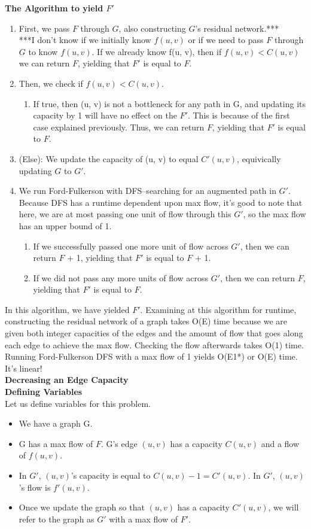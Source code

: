 \documentclass[11pt, solution, letterpaper]{format}
\begin{document}
\textbf{The Algorithm to yield $F'$}
\begin{enumerate}
\item First, we pass $F$ through $G$, also constructing $G$'s residual network.***\\
***I don't know if we initially know $f(u, v)$ or if we need to pass $F$ through $G$ to know $f(u, v)$. If we already know f(u, v), then if $f(u, v) < C(u, v)$ we can return $F$, yielding that $F'$ is equal to $F$.
\item Then, we check if $f(u, v) < C(u, v)$. 
\begin{enumerate}
\item If true, then (u, v) is not a bottleneck for any path in G, and updating its capacity by 1 will have no effect on the $F'$. This is because of the first case explained previously. Thus, we can return $F$, yielding that $F'$ is equal to $F$.
\end{enumerate}
\item (Else): We update the capacity of (u, v) to equal $C'(u, v)$, equivically updating $G$ to $G'$.
\item We run Ford-Fulkerson with DFS--searching for an augmented path in $G'$. Because DFS has a runtime dependent upon max flow, it's good to note that here, we are at most passing one unit of flow through this $G'$, so the max flow has an upper bound of 1.
\begin{enumerate}
\item If we successfully passed one more unit of flow across $G'$, then we can return $F$ + 1, yielding that $F'$ is equal to $F$ + 1.
\item If we did not pass any more units of flow across $G'$, then we can return $F$, yielding that $F'$ is equal to $F$.
\end{enumerate}
\end{enumerate}

In this algorithm, we have yielded $F'$. Examining at this algorithm for runtime, constructing the residual network of a graph takes O(E) time because we are given both integer capacities of the edges and the amount of flow that goes along each edge to achieve the max flow. Checking the flow afterwards takes O(1) time. Running Ford-Fulkerson DFS with a max flow of 1 yields O(E1*) or O(E) time. It's linear!\\

\textbf{Decreasing an Edge Capacity}\\

\textbf{Defining Variables}\\
Let us define variables for this problem. 
\begin{itemize}
    \item We have a graph G. 
    \item G has a max flow of $F$.
    \itme G's edge $(u, v)$  has a capacity $C(u, v)$ and a flow of $f(u, v)$. 
    \item In $G'$, $(u, v)$'s capacity is equal to $C(u, v) - 1 = C'(u, v)$. In $G'$, $(u, v)$'s flow is $f'(u, v)$.
    \item Once we update the graph so that $(u, v)$ has a capacity $C'(u, v)$, we will refer to the graph as $G'$ with a max flow of $F'$.
\end{itemize}  
\end{document}

